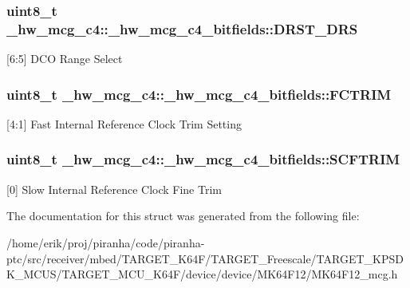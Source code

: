 \subsubsection[{\texorpdfstring{D\+R\+S\+T\+\_\+\+D\+RS}{DRST_DRS}}]{\setlength{\rightskip}{0pt plus 5cm}uint8\+\_\+t \+\_\+hw\+\_\+mcg\+\_\+c4\+::\+\_\+hw\+\_\+mcg\+\_\+c4\+\_\+bitfields\+::\+D\+R\+S\+T\+\_\+\+D\+RS}\hypertarget{struct__hw__mcg__c4_1_1__hw__mcg__c4__bitfields_a6f5e68150ca9d92b8a8c445107bad7fa}{}\label{struct__hw__mcg__c4_1_1__hw__mcg__c4__bitfields_a6f5e68150ca9d92b8a8c445107bad7fa}
\mbox{[}6\+:5\mbox{]} D\+CO Range Select 
\subsubsection[{\texorpdfstring{F\+C\+T\+R\+IM}{FCTRIM}}]{\setlength{\rightskip}{0pt plus 5cm}uint8\+\_\+t \+\_\+hw\+\_\+mcg\+\_\+c4\+::\+\_\+hw\+\_\+mcg\+\_\+c4\+\_\+bitfields\+::\+F\+C\+T\+R\+IM}\hypertarget{struct__hw__mcg__c4_1_1__hw__mcg__c4__bitfields_a6c5dce14372adef4c1a8e82329d41e79}{}\label{struct__hw__mcg__c4_1_1__hw__mcg__c4__bitfields_a6c5dce14372adef4c1a8e82329d41e79}
\mbox{[}4\+:1\mbox{]} Fast Internal Reference Clock Trim Setting 
\subsubsection[{\texorpdfstring{S\+C\+F\+T\+R\+IM}{SCFTRIM}}]{\setlength{\rightskip}{0pt plus 5cm}uint8\+\_\+t \+\_\+hw\+\_\+mcg\+\_\+c4\+::\+\_\+hw\+\_\+mcg\+\_\+c4\+\_\+bitfields\+::\+S\+C\+F\+T\+R\+IM}\hypertarget{struct__hw__mcg__c4_1_1__hw__mcg__c4__bitfields_ae83e105d2de8d7b9df33eee4ceae51e4}{}\label{struct__hw__mcg__c4_1_1__hw__mcg__c4__bitfields_ae83e105d2de8d7b9df33eee4ceae51e4}
\mbox{[}0\mbox{]} Slow Internal Reference Clock Fine Trim 

The documentation for this struct was generated from the following file\+:\begin{DoxyCompactItemize}
\item 
/home/erik/proj/piranha/code/piranha-\/ptc/src/receiver/mbed/\+T\+A\+R\+G\+E\+T\+\_\+\+K64\+F/\+T\+A\+R\+G\+E\+T\+\_\+\+Freescale/\+T\+A\+R\+G\+E\+T\+\_\+\+K\+P\+S\+D\+K\+\_\+\+M\+C\+U\+S/\+T\+A\+R\+G\+E\+T\+\_\+\+M\+C\+U\+\_\+\+K64\+F/device/device/\+M\+K64\+F12/M\+K64\+F12\+\_\+mcg.\+h\end{DoxyCompactItemize}
